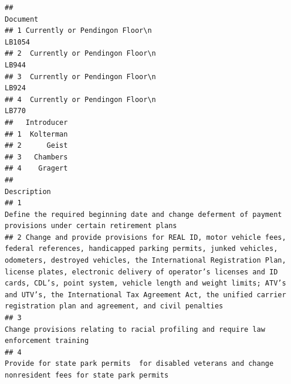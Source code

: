 \documentclass[]{book}
\begin{document}
\begin{verbatim}
##                                                                                               Document
## 1 Currently or Pendingon Floor\n                                                                LB1054
## 2  Currently or Pendingon Floor\n                                                                LB944
## 3  Currently or Pendingon Floor\n                                                                LB924
## 4  Currently or Pendingon Floor\n                                                                LB770
##   Introducer
## 1  Kolterman
## 2      Geist
## 3   Chambers
## 4    Gragert
##                                                                                                                                                                                                                                                                                                                                                                                                                                                           Description
## 1                                                                                                                                                                                                                                                                                                                                                        Define the required beginning date and change deferment of payment provisions under certain retirement plans
## 2 Change and provide provisions for REAL ID, motor vehicle fees, federal references, handicapped parking permits, junked vehicles, odometers, destroyed vehicles, the International Registration Plan, license plates, electronic delivery of operator’s licenses and ID cards, CDL’s, point system, vehicle length and weight limits; ATV’s and UTV’s, the International Tax Agreement Act, the unified carrier registration plan and agreement, and civil penalties
## 3                                                                                                                                                                                                                                                                                                                                                                                 Change provisions relating to racial profiling and require law enforcement training
## 4                                                                                                                                                                                                                                                                                                                                                            Provide for state park permits  for disabled veterans and change nonresident fees for state park permits
\end{verbatim}
\end{document}
